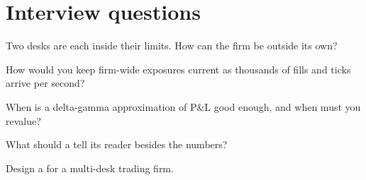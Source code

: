 \section{Interview questions}

\begin{interviewq}\label{iq:pl:real-time-risk:1}
Two desks are each inside their limits. How can the firm be outside its own?
\end{interviewq}

\begin{interviewq}\label{iq:pl:real-time-risk:2}
How would you keep firm-wide exposures current as thousands of fills and ticks arrive per second?
\end{interviewq}

\begin{interviewq}\label{iq:pl:real-time-risk:3}
When is a delta-gamma approximation of P\&L good enough, and when must you revalue?
\end{interviewq}

\begin{interviewq}\label{iq:pl:real-time-risk:4}
What should a  tell its reader besides the numbers?
\end{interviewq}

\begin{interviewq}\label{iq:pl:real-time-risk:5}
Design a  for a multi-desk trading firm.
\end{interviewq}
